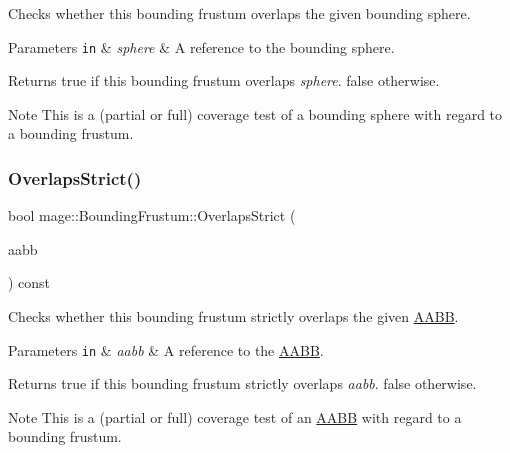 Checks whether this bounding frustum overlaps the given bounding sphere.


\begin{DoxyParams}[1]{Parameters}
\mbox{\tt in}  & {\em sphere} & A reference to the bounding sphere. \\
\hline
\end{DoxyParams}
\begin{DoxyReturn}{Returns}
{\ttfamily true} if this bounding frustum overlaps {\itshape sphere}. {\ttfamily false} otherwise. 
\end{DoxyReturn}
\begin{DoxyNote}{Note}
This is a (partial or full) coverage test of a bounding sphere with regard to a bounding frustum. 
\end{DoxyNote}
\mbox{\label{classmage_1_1_bounding_frustum_af3a6772edd09480a22a175fa4acbfbd8}} 
\subsubsection{\texorpdfstring{Overlaps\+Strict()}{OverlapsStrict()}\hspace{0.1cm}{\footnotesize\ttfamily [1/2]}}
{\footnotesize\ttfamily bool mage\+::\+Bounding\+Frustum\+::\+Overlaps\+Strict (\begin{DoxyParamCaption}\item[{const \mbox{\hyperlink{classmage_1_1_a_a_b_b}{A\+A\+BB}} \&}]{aabb }\end{DoxyParamCaption}) const\hspace{0.3cm}{\ttfamily [noexcept]}}

Checks whether this bounding frustum strictly overlaps the given \mbox{\hyperlink{classmage_1_1_a_a_b_b}{A\+A\+BB}}.


\begin{DoxyParams}[1]{Parameters}
\mbox{\tt in}  & {\em aabb} & A reference to the \mbox{\hyperlink{classmage_1_1_a_a_b_b}{A\+A\+BB}}. \\
\hline
\end{DoxyParams}
\begin{DoxyReturn}{Returns}
{\ttfamily true} if this bounding frustum strictly overlaps {\itshape aabb}. {\ttfamily false} otherwise. 
\end{DoxyReturn}
\begin{DoxyNote}{Note}
This is a (partial or full) coverage test of an \mbox{\hyperlink{classmage_1_1_a_a_b_b}{A\+A\+BB}} with regard to a bounding frustum. 
\end{DoxyNote}
\mbox{\label{classmage_1_1_bounding_frustum_a070075ad4af9935b7b60e7e5345d0aff}} 
